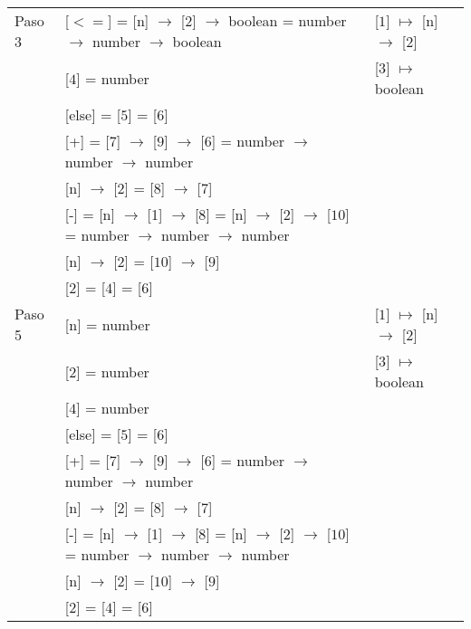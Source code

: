 \documentclass{article}
\begin{document}
\begin{center}
\begin{longtable}{ | l | p{10 cm} | p{5 cm} | }
  Paso 3  & [$<=$] = [n] $\rightarrow$ [2] $\rightarrow$ boolean = 
	 number $\rightarrow$ number $\rightarrow$ boolean									& [$\boxed{1}$] $\mapsto$ [n] $\rightarrow$ [$\boxed{2}$]	\\ 
	 & [$\boxed{4}$] = number												& [$\boxed{3}$] $\mapsto$ boolean	\\ 
	 & [else] = [$\boxed{5}$] = [$\boxed{6}$]										&	\\
	 & [+] = [$\boxed{7}$] $\rightarrow$ [$\boxed{9}$] $\rightarrow$ [$\boxed{6}$] = 
	 number $\rightarrow$ number $\rightarrow$ number									&	\\ 
	 & [n] $\rightarrow$ [$\boxed{2}$] = [$\boxed{8}$] $\rightarrow$ [$\boxed{7}$]						&	\\
	 & [-] = [n] $\rightarrow$ [1] $\rightarrow$ [$\boxed{8}$] = [n] $\rightarrow$ [2] $\rightarrow$ [$\boxed{10}$] =
	   number $\rightarrow$ number $\rightarrow$ number									&	\\
	 & [n] $\rightarrow$ [$\boxed{2}$] = [$\boxed{10}$] $\rightarrow$ [$\boxed{9}$] 					&	\\ 
	 & [$\boxed{2}$] = [$\boxed{4}$] = [$\boxed{6}$]									&	\\ \hline
	 
  Paso 5 & [n] = number 													& [$\boxed{1}$] $\mapsto$ [n] $\rightarrow$ [$\boxed{2}$]	\\ 
	 & [2] = number														& [$\boxed{3}$] $\mapsto$ boolean \\
	 & [$\boxed{4}$] = number												& 	\\ 
	 & [else] = [$\boxed{5}$] = [$\boxed{6}$]										&	\\
	 & [+] = [$\boxed{7}$] $\rightarrow$ [$\boxed{9}$] $\rightarrow$ [$\boxed{6}$] = 
	 number $\rightarrow$ number $\rightarrow$ number									&	\\ 
	 & [n] $\rightarrow$ [$\boxed{2}$] = [$\boxed{8}$] $\rightarrow$ [$\boxed{7}$]						&	\\
	 & [-] = [n] $\rightarrow$ [1] $\rightarrow$ [$\boxed{8}$] = [n] $\rightarrow$ [2] $\rightarrow$ [$\boxed{10}$] =
	   number $\rightarrow$ number $\rightarrow$ number									&	\\
	 & [n] $\rightarrow$ [$\boxed{2}$] = [$\boxed{10}$] $\rightarrow$ [$\boxed{9}$] 					&	\\ 
	 & [$\boxed{2}$] = [$\boxed{4}$] = [$\boxed{6}$]									&	\\ \hline
	 

\end{longtable}
\end{center}
\end{document}
